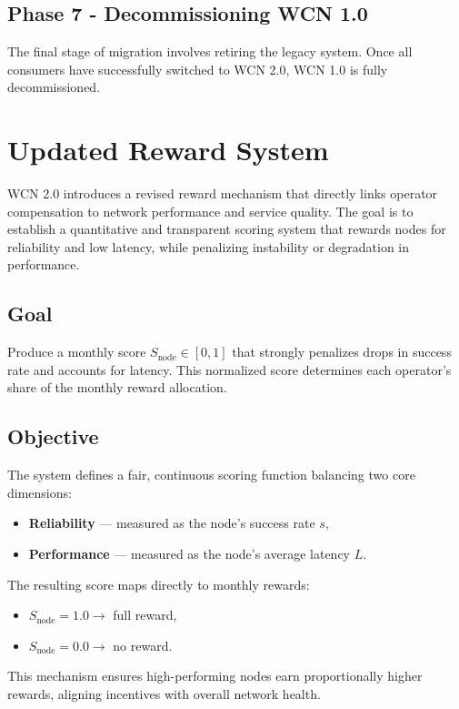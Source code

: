 \documentclass[10pt,twocolumn]{article}
\begin{document}
\subsection*{Phase 7 - Decommissioning WCN 1.0}

The final stage of migration involves retiring the legacy system. Once all consumers have successfully switched to WCN 2.0, WCN 1.0 is fully decommissioned.

\section{Updated Reward System}

WCN 2.0 introduces a revised reward mechanism that directly links operator compensation to network performance and service quality.
The goal is to establish a quantitative and transparent scoring system that rewards nodes for reliability and low latency, while penalizing instability or degradation in performance.

\subsection*{Goal}
Produce a monthly score $S_{\text{node}} \in [0,1]$ that strongly penalizes drops in success rate and accounts for latency.
This normalized score determines each operator's share of the monthly reward allocation.

\subsection{Objective}
The system defines a fair, continuous scoring function balancing two core dimensions:
\begin{itemize}
    \item \textbf{Reliability} --- measured as the node's success rate $s$,
    \item \textbf{Performance} --- measured as the node's average latency $L$.
\end{itemize}

The resulting score maps directly to monthly rewards:
\begin{itemize}
    \item $S_{\text{node}} = 1.0 \rightarrow$ full reward,
    \item $S_{\text{node}} = 0.0 \rightarrow$ no reward.
\end{itemize}
This mechanism ensures high-performing nodes earn proportionally higher rewards, aligning incentives with overall network health.
\end{document}
